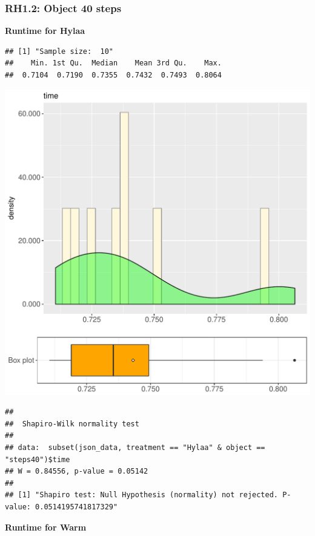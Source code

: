 \documentclass{article}\usepackage[]{graphicx}\usepackage[]{color}
\makeatletter
\def\maxwidth{ %
  \ifdim\Gin@nat@width>\linewidth
    \linewidth
  \else
    \Gin@nat@width
  \fi
}
\newenvironment{kframe}{%
 \def\at@end@of@kframe{}%
 \ifinner\ifhmode%
  \def\at@end@of@kframe{\end{minipage}}%
  \begin{minipage}{\columnwidth}%
 \fi\fi%
 \def\FrameCommand##1{\hskip\@totalleftmargin \hskip-\fboxsep
 \colorbox{shadecolor}{##1}\hskip-\fboxsep
     \hskip-\linewidth \hskip-\@totalleftmargin \hskip\columnwidth}%
 \MakeFramed {\advance\hsize-\width
   \@totalleftmargin\z@ \linewidth\hsize
   \@setminipage}}%
 {\par\unskip\endMakeFramed%
 \at@end@of@kframe}
\newenvironment{knitrout}{}{} %
\makeatother
\begin{document}
\subsubsection{RH1.2: Object 40 steps}

 \textbf{Runtime for Hylaa}
\begin{knitrout}
\color{fgcolor}\begin{kframe}
\begin{verbatim}
## [1] "Sample size:  10"
##    Min. 1st Qu.  Median    Mean 3rd Qu.    Max. 
##  0.7104  0.7190  0.7355  0.7432  0.7493  0.8064
\end{verbatim}
\end{kframe}
\includegraphics[width=\maxwidth]{figure/RH1_Hylaa_steps40-1} 
\begin{kframe}\begin{verbatim}
## 
## 	Shapiro-Wilk normality test
## 
## data:  subset(json_data, treatment == "Hylaa" & object == "steps40")$time
## W = 0.84556, p-value = 0.05142
## 
## [1] "Shapiro test: Null Hypothesis (normality) not rejected. P-value: 0.0514195741817329"
\end{verbatim}
\end{kframe}
\end{knitrout}
 \textbf{Runtime for Warm}
\end{document}
